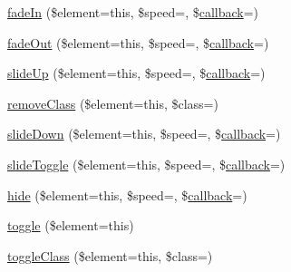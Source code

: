 \begin{DoxyCompactItemize}
\item 
\mbox{\hyperlink{class_c_i___javascript_ac4255e434413b0b439e6ecd2d19f54d1}{fade\+In}} (\$element=\textquotesingle{}this\textquotesingle{}, \$speed=\textquotesingle{}\textquotesingle{}, \$\mbox{\hyperlink{_functions_8php_ae2242eb47799ca6a822b022dc1bd1ac9}{callback}}=\textquotesingle{}\textquotesingle{})
\item 
\mbox{\hyperlink{class_c_i___javascript_a7d2f81e611696887be4f8a1edeb55bd4}{fade\+Out}} (\$element=\textquotesingle{}this\textquotesingle{}, \$speed=\textquotesingle{}\textquotesingle{}, \$\mbox{\hyperlink{_functions_8php_ae2242eb47799ca6a822b022dc1bd1ac9}{callback}}=\textquotesingle{}\textquotesingle{})
\item 
\mbox{\hyperlink{class_c_i___javascript_a3d94535f1d68c62698e733d34152d1f9}{slide\+Up}} (\$element=\textquotesingle{}this\textquotesingle{}, \$speed=\textquotesingle{}\textquotesingle{}, \$\mbox{\hyperlink{_functions_8php_ae2242eb47799ca6a822b022dc1bd1ac9}{callback}}=\textquotesingle{}\textquotesingle{})
\item 
\mbox{\hyperlink{class_c_i___javascript_a909e52e0a7e3ddd7e6520965618d50f4}{remove\+Class}} (\$element=\textquotesingle{}this\textquotesingle{}, \$class=\textquotesingle{}\textquotesingle{})
\item 
\mbox{\hyperlink{class_c_i___javascript_a252f34441b5adb1b8bec1aa93b4140e1}{slide\+Down}} (\$element=\textquotesingle{}this\textquotesingle{}, \$speed=\textquotesingle{}\textquotesingle{}, \$\mbox{\hyperlink{_functions_8php_ae2242eb47799ca6a822b022dc1bd1ac9}{callback}}=\textquotesingle{}\textquotesingle{})
\item 
\mbox{\hyperlink{class_c_i___javascript_a7919ca63a6371117a366baacd6412491}{slide\+Toggle}} (\$element=\textquotesingle{}this\textquotesingle{}, \$speed=\textquotesingle{}\textquotesingle{}, \$\mbox{\hyperlink{_functions_8php_ae2242eb47799ca6a822b022dc1bd1ac9}{callback}}=\textquotesingle{}\textquotesingle{})
\item 
\mbox{\hyperlink{class_c_i___javascript_ace07091981f312c3be8238f08815142c}{hide}} (\$element=\textquotesingle{}this\textquotesingle{}, \$speed=\textquotesingle{}\textquotesingle{}, \$\mbox{\hyperlink{_functions_8php_ae2242eb47799ca6a822b022dc1bd1ac9}{callback}}=\textquotesingle{}\textquotesingle{})
\item 
\mbox{\hyperlink{class_c_i___javascript_aea72ca9a9b57e1cae194f84dbcb30d70}{toggle}} (\$element=\textquotesingle{}this\textquotesingle{})
\item 
\mbox{\hyperlink{class_c_i___javascript_ab3f471c0411b110bc11f62fa26e9a9e3}{toggle\+Class}} (\$element=\textquotesingle{}this\textquotesingle{}, \$class=\textquotesingle{}\textquotesingle{})

\end{DoxyCompactItemize}
